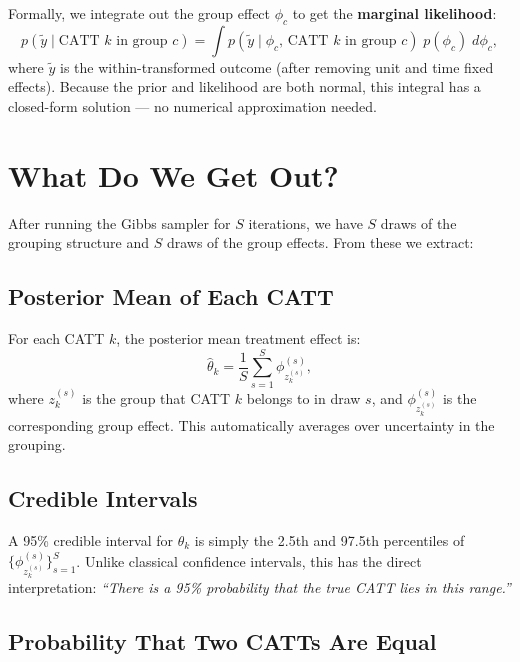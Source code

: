 \documentclass[12pt]{article}
\begin{document}
Formally, we integrate out the group effect $\phi_c$ to get the
\textbf{marginal likelihood}:
\begin{equation}
  p(\tilde{y} \mid \text{CATT } k \text{ in group } c)
  = \int p(\tilde{y} \mid \phi_c,\, \text{CATT } k \text{ in group } c)\;
          p(\phi_c)\; d\phi_c,
\end{equation}
where $\tilde{y}$ is the within-transformed outcome (after removing unit and
time fixed effects). Because the prior and likelihood are both normal, this
integral has a closed-form solution --- no numerical approximation needed.

\section{What Do We Get Out?}

After running the Gibbs sampler for $S$ iterations, we have $S$ draws of the
grouping structure and $S$ draws of the group effects. From these we extract:

\subsection{Posterior Mean of Each CATT}

For each CATT $k$, the posterior mean treatment effect is:
\begin{equation}
  \hat{\theta}_k = \frac{1}{S}\sum_{s=1}^{S} \phi_{z_k^{(s)}}^{(s)},
\end{equation}
where $z_k^{(s)}$ is the group that CATT $k$ belongs to in draw $s$, and
$\phi_{z_k^{(s)}}^{(s)}$ is the corresponding group effect. This automatically
averages over uncertainty in the grouping.

\subsection{Credible Intervals}

A 95\% credible interval for $\theta_k$ is simply the 2.5th and 97.5th
percentiles of $\{\phi_{z_k^{(s)}}^{(s)}\}_{s=1}^{S}$. Unlike classical
confidence intervals, this has the direct interpretation: \textit{``There is a
95\% probability that the true CATT lies in this range.''}

\subsection{Probability That Two CATTs Are Equal}
\end{document}
